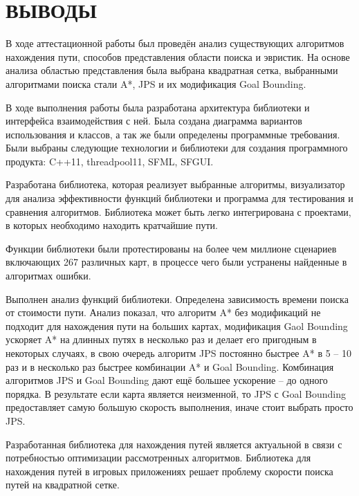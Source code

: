 \section*{ВЫВОДЫ}

\vspace{1\baselineskip} 

В ходе аттестационной работы был проведён анализ существующих алгоритмов нахождения пути, способов представления области поиска и эвристик. На основе анализа областью представления была выбрана квадратная сетка, выбранными алгоритмами поиска стали A*, JPS и их модификация Goal Bounding.

В ходе выполнения работы была разработана архитектура библиотеки и интерфейса взаимодействия с ней. Была создана диаграмма вариантов использования и классов, а так же были определены программные требования. Были выбраны следующие технологии и библиотеки для создания программного продукта: C++11, threadpool11, SFML, SFGUI.

Разработана библиотека, которая реализует выбранные алгоритмы, визуализатор для анализа эффективности функций библиотеки и программа для тестирования и сравнения алгоритмов. Библиотека может быть легко интегрирована с проектами, в которых необходимо находить кратчайшие пути.

Функции библиотеки были протестированы на более чем миллионе сценариев включающих 267 различных карт, в процессе чего были устранены найденные в алгоритмах ошибки.

Выполнен анализ функций библиотеки. Определена зависимость времени поиска от стоимости пути. Анализ показал, что алгоритм A* без модификаций не подходит для нахождения пути на больших картах, модификация Gaol Bounding ускоряет A* на длинных путях в несколько раз и делает его пригодным в некоторых случаях, в свою очередь алгоритм JPS постоянно быстрее A* в 5 -- 10 раз и в несколько раз быстрее комбинации A* и Goal Bounding. Комбинация алгоритмов JPS и Goal Bounding дают ещё большее ускорение -- до одного порядка. В результате если карта является неизменной, то JPS с Goal Bounding предоставляет самую большую скорость выполнения, иначе стоит выбрать просто JPS.

Разработанная библиотека для нахождения путей является актуальной в связи с потребностью оптимизации рассмотренных алгоритмов. Библиотека для нахождения путей в игровых приложениях решает проблему скорости поиска путей на квадратной сетке.